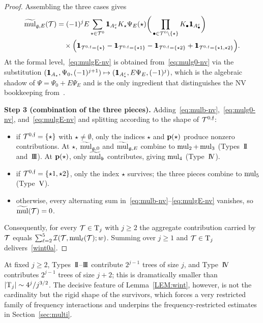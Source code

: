 \begin{proof}
Assembling the three cases gives
\begin{align}
\label{eq:mulgE-nv}
\wt{\mul}_{\gfrak,E}(\TT)
&= (-1)^j E \sum_{\star\in \TT^0} \ind_{A_\star^c}K_\star\Psi_E(\star) \bigg(\prod_{\bul\in \TT^0\setminus\{\star\}}K_\bul\ind_{A_\bul^c}\bigg) \nonumber\\
&\quad \times\Big( \ind_{\TT^{0,\ff}=\{\star\}} - \ind_{\TT^{0,\ff}=\{\star1\}} - \ind_{\TT^{0,\ff}=\{\star2\}} + \ind_{\TT^{0,\ff}=\{\star1,\star2\}}\Big).
\end{align}
At the formal level,~\eqref{eq:mulgE-nv} is obtained from~\eqref{eq:mulg0-nv} via the substitution $(\ind_{A_\star},\Psi_0,(-1)^{j+1}) \mapsto (\ind_{A_\star^c}, E\Psi_E,(-1)^j)$, which is the algebraic shadow of $\Psi=\Psi_0+E\Psi_E$ and is the only ingredient that distinguishes the NV bookkeeping from~\cite[Lemma~2.10]{chcora}.

\medskip

\noindent\textbf{Step 3 (combination of the three pieces).}
Adding~\eqref{eq:mulb-nv},~\eqref{eq:mulg0-nv}, and~\eqref{eq:mulgE-nv} and splitting according to the shape of $\mathcal{T}^{0,\mathfrak{f}}$:
\begin{itemize}
\item if $\mathcal{T}^{0,\mathfrak{f}}=\{\star\}$ with $\star\neq \emptyset$, only the indices $\star$ and $\mathbf{p}(\star)$ produce nonzero contributions. At $\star$, $\widetilde{\operatorname{mul}}_{\mathfrak{g},0}$ and $\widetilde{\operatorname{mul}}_{\mathfrak{g},E}$ combine to $\operatorname{mul}_2+\operatorname{mul}_3$ (Types~$\II$ and~$\III$). At $\mathbf{p}(\star)$, only $\widetilde{\operatorname{mul}}_{\mathfrak{b}}$ contributes, giving $\operatorname{mul}_4$ (Type~$\IV$).
\item if $\mathcal{T}^{0,\mathfrak{f}}=\{\star1,\star2\}$, only the index $\star$ survives; the three pieces combine to $\operatorname{mul}_5$ (Type~$\textup{V}$).
\item otherwise, every alternating sum in~\eqref{eq:mulb-nv}--\eqref{eq:mulgE-nv} vanishes, so $\widetilde{\operatorname{mul}}(\mathcal{T})=0$.
\end{itemize}
Consequently, for every $\mathcal{T}\in \mathrm{T}_j$ with $j\ge 2$ the aggregate contribution carried by $\mathcal{T}$ equals $\sum_{\ell=2}^5 \mathcal{I}(\mathcal{T},\operatorname{mul}_\ell(\mathcal{T});w)$. Summing over $j\ge 1$ and $\mathcal{T}\in\mathrm{T}_j$ delivers~\eqref{wint0a}.
\end{proof}

\begin{remark}
At fixed $j\ge 2$, Types~$\II$--$\III$ contribute $2^{j-1}$ trees of size $j$, and Type~$\IV$ contributes $2^{j-1}$ trees of size $j+2$; this is dramatically smaller than $|\mathrm{T}_j|\sim 4^j/j^{3/2}$. The decisive feature of Lemma~\ref{LEM:wint}, however, is not the cardinality but the rigid shape of the survivors, which forces a very restricted family of frequency interactions and underpins the frequency-restricted estimates in Section~\ref{sec:multi}.
\end{remark}

